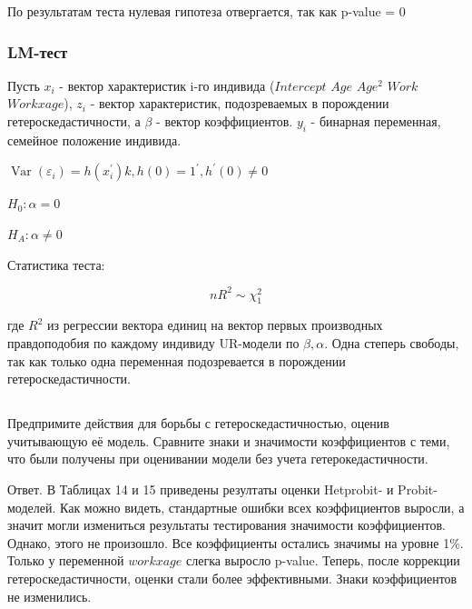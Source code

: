 \documentclass[a4paper,12pt]{article}
\def \e{\varepsilon}
\DeclareMathOperator{\Var}{Var}
\def \b{\beta}
\def \e{\varepsilon}
\begin{document}
По результатам теста нулевая гипотеза отвергается, так как p-value = 0
\subsubsection{LM-тест}


Пусть $ x_i $ - вектор характеристик i-го индивида ($ Intercept $ $  Age  $ $ Age^2 $ $ Work  $ $ Workxage $), $ z_i $ - вектор характеристик, подозреваемых в порождении гетероскедастичности, а $ \b $ - вектор коэффициентов. $ y_i $ - бинарная переменная, семейное положение индивида. 

$ \Var(\e_i) = h(x_i^{\prime})k, h(0) = 1^{\prime}, h^{\prime}(0) \neq 0 $


$ H_0: \alpha = 0 $

$ H_A: \alpha \neq 0 $

Статистика теста:

\[ nR^2 \sim \chi^2_1 \]

где $ R^2 $ из регрессии вектора единиц на вектор первых производных правдоподобия по каждому индивиду UR-модели по $ \b, \alpha $. Одна степерь свободы, так как только одна переменная подозревается в порождении гетероскедастичности. 

\subsection{}

\Sun Предпримите действия для борьбы с гетероскедастичностью, оценив
учитывающую её модель. Сравните знаки и значимости коэффициентов с теми, что были
получены при оценивании модели без учета гетерокедастичности.

Ответ. В Таблицах 14 и 15 приведены резултаты оценки Hetprobit- и Probit-моделей. Как можно видеть, стандартные ошибки всех коэффициентов выросли, а значит могли измениться результаты тестирования значимости коэффициентов. Однако, этого не произошло. Все коэффициенты остались значимы на уровне 1\%. Только у переменной  $ workxage $ слегка выросло p-value.  Теперь, после коррекции гетероскедастичности, оценки стали более эффективными. Знаки коэффициентов не изменились.
\end{document}
